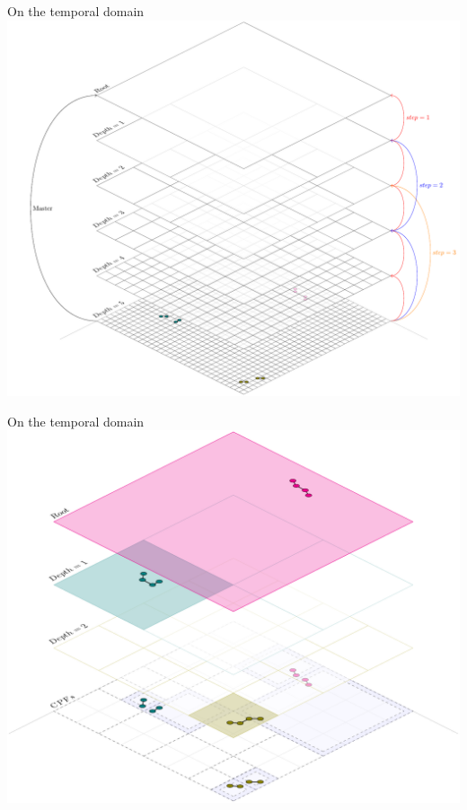 \begin{frame}{On the temporal domain}
    \centering
    \includegraphics[height=0.8\textheight]{../thesis/chapterPFlocks/figures/plots/11_temporal_partitions/MasterByLevel}
\end{frame}

\begin{frame}{On the temporal domain}
    \centering
    \includegraphics[height=0.8\textheight]{../thesis/chapterPFlocks/figures/plots/11_temporal_partitions/LCA}
\end{frame}

